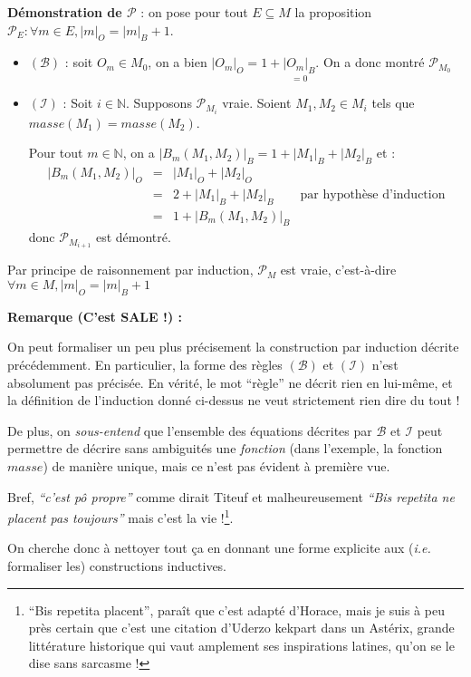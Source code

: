 \documentclass[../../main.tex]{subfiles}
\begin{document}
\textbf{Démonstration de $\mathcal{P}$} : on pose pour tout $E\subseteq M$ la proposition $\mathcal{P}_E : \forall m\in E, |m|_O = |m|_B + 1$.
\begin{itemize}
	\item $(\mathcal{B})$ : soit $O_m\in M_0$, on a bien $|O_m|_O = 1 + \underset{=0}{|O_m|_B}$. On a donc montré $\mathcal{P}_{M_0}$
	\item $(\mathcal{I})$ : Soit $i\in\mathbb{N}$. Supposons $\mathcal{P}_{M_i}$ vraie. Soient $M_1, M_2\in M_i$ tels que $masse(M_1) = masse(M_2)$. 

	Pour tout $m\in\mathbb{N}$, on a $|B_m(M_1, M_2)|_B = 1 + |M_1|_B + |M_2|_B$ et :
	$$
	\begin{array}{lcll}
	|B_m(M_1, M_2)|_O & = & |M_1|_O + |M_2|_O \\
	& = & 2 + |M_1|_B + |M_2|_B & \text{par hypothèse d'induction} \\
	& = & 1 + |B_m(M_1, M_2)|_B
	\end{array}
	$$
	donc $\mathcal{P}_{M_{i+1}}$ est démontré.
\end{itemize}
Par principe de raisonnement par induction, $\mathcal{P}_{M}$ est vraie, c'est-à-dire $\forall m\in M, |m|_O = |m|_B + 1$

\textbf{Remarque (C'est SALE !) :}

On peut formaliser un peu plus précisement la construction par induction décrite précédemment. En particulier, la forme des règles $(\mathcal{B})$ et $(\mathcal{I})$ n'est absolument pas précisée. En vérité, le mot ``règle'' ne décrit rien en lui-même, et la définition de l'induction donné ci-dessus ne veut strictement rien dire du tout !

De plus, on \textit{sous-entend} que l'ensemble des équations décrites par $\mathcal{B}$ et $\mathcal{I}$ peut permettre de décrire sans ambiguités une \textit{fonction} (dans l'exemple, la fonction $masse$) de manière unique, mais ce n'est pas évident à première vue.

Bref, \textit{``c'est pô propre''} comme dirait Titeuf et malheureusement \textit{``Bis repetita ne placent pas toujours''} mais c'est la vie !\footnote{``Bis repetita placent'', paraît que c'est adapté d'Horace, mais je suis à peu près certain que c'est une citation d'Uderzo kekpart dans un Astérix, grande littérature historique qui vaut amplement ses inspirations latines, qu'on se le dise sans sarcasme !}.

On cherche donc à nettoyer tout ça en donnant une forme explicite aux (\textit{i.e.} formaliser les) constructions inductives.
\end{document}
